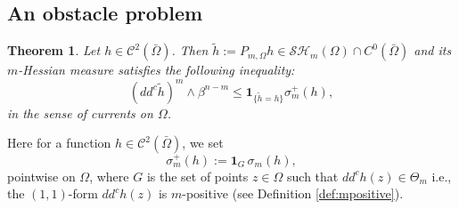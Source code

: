 \documentclass[11pt]{article}
\newcommand{\ie}{i.e.,\xspace}
\newcommand{\Subsection}{\subsection}
\numberwithin{equation}{section}
\newtheorem{theorem}{Theorem}[section]
\theoremstyle{definition}
\newcommand{\Cc}{\mathcal{C}}
\theoremstyle{plain}
\theoremstyle{definition}
\begin{document}
\Subsection{An obstacle problem}

\begin{theorem} \label{thm:obstacle}
Let $h \in \Cc^2 ({\bar{\Omega}})$. Then $\tilde h:= P_{m,\Omega} h \in \mathcal{SH}_m (\Omega) \cap C^0 (\bar \Omega)$ and its $m$\nobreakdash-Hessian measure satisfies the following inequality:
\begin{equation} \label{eq:BerIneq1}
(dd^c \tilde h)^m \wedge \beta^{n - m} \leq \mathbf{1}_{\{ \tilde h = h\}} \sigma_m^+ (h),
\end{equation}
in the sense of currents on $\Omega$.
\end{theorem}
Here for a function $h \in \Cc^2 ({\bar{\Omega}})$, we set
\[
\sigma_m^+ (h):= \mathbf{1}_G \, \sigma_m (h),
\]
pointwise on $\Omega$, where $G$ is the set of points $z \in \Omega$ such that $dd^c h (z) \in \Theta_m$ \ie the $(1,1)$-form $dd^c h (z)$ is $m$-positive (see Definition \ref{def:mpositive}).
\end{document}
